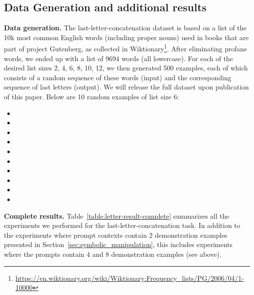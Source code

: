 \subsection{Data Generation and additional results}
\label{app:letter-data-result}
\textbf{Data generation.}
The last-letter-concatenation dataset is based on a list of the 10k most common English words (including proper nouns) used in books that are part of project Gutenberg, as collected in Wiktionary\footnote{\url{https://en.wiktionary.org/wiki/Wiktionary:Frequency_lists/PG/2006/04/1-10000}}. After eliminating profane words, we ended up with a list of 9694 words (all lowercase). For each of the desired list sizes 2, 4, 6, 8, 10, 12, we then generated 500 examples, each of which consists of a random sequence of these words (input) and the corresponding sequence of last letters (output). We will release the full dataset upon publication of this paper. Below are 10 random examples of list size 6:

\begin{itemize}
\item {}
\item {}
\item {}
\item {}
\item {}
\item {}
\item {}
\item {}
\item {}
\item {}
\end{itemize}

\textbf{Complete results.}
Table~\ref{table:letter-result-complete} summarizes all the experiments we performed for the last-letter-concatenation task. In addition to the experiments where prompt contexts contain 2 demonstration examples presented in Section~\ref{sec:symbolic_manipulation}, this includes experiments where the prompts contain 4 and 8 demonstration examples (see above).

